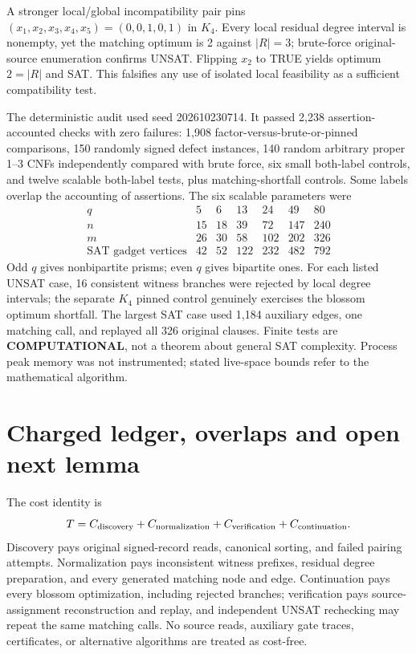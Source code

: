 \documentclass[11pt]{article}
\begin{document}
A stronger local/global incompatibility pair pins $(x_1,x_2,x_3,x_4,x_5)=(0,0,1,0,1)$ in $K_4$. Every local residual degree interval is nonempty, yet the matching optimum is 2 against $|R|=3$; brute-force original-source enumeration confirms UNSAT. Flipping $x_2$ to TRUE yields optimum $2=|R|$ and SAT. This falsifies any use of isolated local feasibility as a sufficient compatibility test.

The deterministic audit used seed 202610230714. It passed 2,238 assertion-accounted checks with zero failures: 1,908 factor-versus-brute-or-pinned comparisons, 150 randomly signed defect instances, 140 random arbitrary proper 1--3 CNFs independently compared with brute force, six small both-label controls, and twelve scalable both-label tests, plus matching-shortfall controls. Some labels overlap the accounting of assertions. The six scalable parameters were
\[
\begin{array}{c|rrrrrr}
q&5&6&13&24&49&80\\\hline
n&15&18&39&72&147&240\\
m&26&30&58&102&202&326\\
\text{SAT gadget vertices}&42&52&122&232&482&792
\end{array}
\]
Odd $q$ gives nonbipartite prisms; even $q$ gives bipartite ones. For each listed UNSAT case, 16 consistent witness branches were rejected by local degree intervals; the separate $K_4$ pinned control genuinely exercises the blossom optimum shortfall. The largest SAT case used 1,184 auxiliary edges, one matching call, and replayed all 326 original clauses. Finite tests are \textbf{COMPUTATIONAL}, not a theorem about general SAT complexity. Process peak memory was not instrumented; stated live-space bounds refer to the mathematical algorithm.

\section{Charged ledger, overlaps and open next lemma}
The cost identity is
\[
T=C_{\rm discovery}+C_{\rm normalization}+C_{\rm verification}+C_{\rm continuation}.
\]
Discovery pays original signed-record reads, canonical sorting, and failed pairing attempts. Normalization pays inconsistent witness prefixes, residual degree preparation, and every generated matching node and edge. Continuation pays every blossom optimization, including rejected branches; verification pays source-assignment reconstruction and replay, and independent UNSAT rechecking may repeat the same matching calls. No source reads, auxiliary gate traces, certificates, or alternative algorithms are treated as cost-free.
\end{document}
